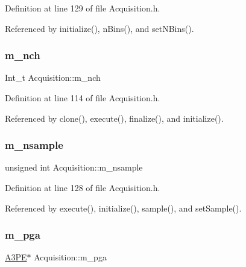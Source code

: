 Definition at line 129 of file Acquisition.\+h.



Referenced by initialize(), n\+Bins(), and set\+N\+Bins().

\mbox{\label{classAcquisition_a1860c7a03a65ea7a778d30dd4a40e1e1}} 
\subsubsection{\texorpdfstring{m\+\_\+nch}{m\_nch}}
{\footnotesize\ttfamily Int\+\_\+t Acquisition\+::m\+\_\+nch\hspace{0.3cm}{\ttfamily [private]}}



Definition at line 114 of file Acquisition.\+h.



Referenced by clone(), execute(), finalize(), and initialize().

\mbox{\label{classAcquisition_a26d0f1a44309ffac49c365b7ee568ab2}} 
\subsubsection{\texorpdfstring{m\+\_\+nsample}{m\_nsample}}
{\footnotesize\ttfamily unsigned int Acquisition\+::m\+\_\+nsample\hspace{0.3cm}{\ttfamily [private]}}



Definition at line 128 of file Acquisition.\+h.



Referenced by execute(), initialize(), sample(), and set\+Sample().

\mbox{\label{classAcquisition_aac113fd42c6574cdb4154e9808a21b67}} 
\subsubsection{\texorpdfstring{m\+\_\+pga}{m\_pga}}
{\footnotesize\ttfamily \hyperlink{classA3PE}{A3\+PE}$\ast$ Acquisition\+::m\+\_\+pga\hspace{0.3cm}{\ttfamily [private]}}



